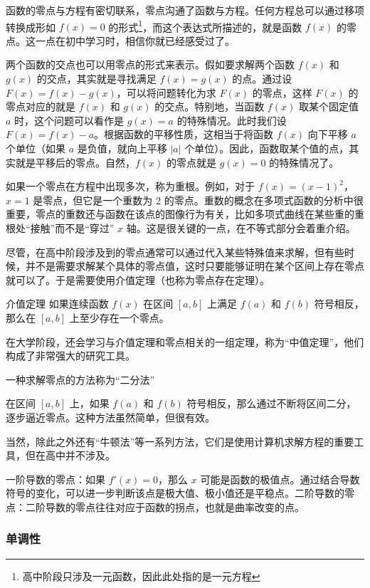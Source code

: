 函数的零点与方程有密切联系，零点沟通了函数与方程。任何方程总可以通过移项转换成形如 $f(x) = 0$ 的形式\footnote{高中阶段只涉及一元函数，因此此处指的是一元方程}，而这个表达式所描述的，就是函数 $f(x)$ 的零点。这一点在初中学习时，相信你就已经感受过了。

两个函数的交点也可以用零点的形式来表示。假如要求解两个函数 $f(x)$ 和 $g(x)$ 的交点，其实就是寻找满足 $f(x) = g(x)$ 的点。通过设 $F(x) = f(x) - g(x)$，可以将问题转化为求 $F(x)$ 的零点，这样 $F(x)$ 的零点对应的就是 $f(x)$ 和 $g(x)$ 的交点。特别地，当函数 $f(x)$ 取某个固定值 $a$ 时，这个问题可以看作是 $g(x) = a$ 的特殊情况。此时我们设 $F(x) = f(x) - a$。根据函数的平移性质，这相当于将函数 $f(x)$ 向下平移 $a$ 个单位（如果 $a$ 是负值，就向上平移 $|a|$ 个单位）。因此，函数取某个值的点，其实就是平移后的零点。自然，$f(x)$ 的零点就是 $g(x) = 0$ 的特殊情况了。

如果一个零点在方程中出现多次，称为重根。例如，对于 $f(x) = (x - 1)^2$，$x = 1$ 是零点，但它是一个重数为 2 的零点。重数的概念在多项式函数的分析中很重要，零点的重数还与函数在该点的图像行为有关，比如多项式曲线在某些重的重根处“接触”而不是“穿过” $x$ 轴。这是很关键的一点，在不等式部分会着重介绍。

尽管，在高中阶段涉及到的零点通常可以通过代入某些特殊值来求解，但有些时候，并不是需要求解某个具体的零点值，这时只要能够证明在某个区间上存在零点就可以了。于是需要使用介值定理（也称为零点存在定理）。

\begin{definition}{介值定理}
如果连续函数 $f(x)$ 在区间 $[a, b]$ 上满足 $f(a)$ 和 $f(b)$ 符号相反，那么在 $[a, b]$ 上至少存在一个零点。
\end{definition}

在大学阶段，还会学习与介值定理和零点相关的一组定理，称为“中值定理”，他们构成了非常强大的研究工具。

一种求解零点的方法称为“二分法”

在区间 $[a, b]$ 上，如果 $f(a)$ 和 $f(b)$ 符号相反，那么通过不断将区间二分，逐步逼近零点。这种方法虽然简单，但很有效。

当然，除此之外还有“牛顿法”等一系列方法，它们是使用计算机求解方程的重要工具，但在高中并不涉及。


一阶导数的零点：如果 $f'(x) = 0$，那么 $x$ 可能是函数的极值点。通过结合导数符号的变化，可以进一步判断该点是极大值、极小值还是平稳点。二阶导数的零点：二阶导数的零点往往对应于函数的拐点，也就是曲率改变的点。

\subsubsection{单调性}



